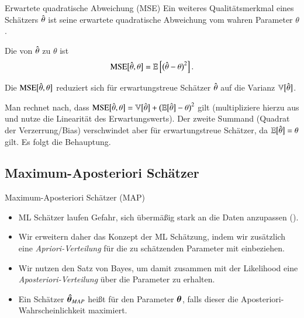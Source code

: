 \begin{frame}{Erwartete quadratische Abweichung (MSE)}{}
	Ein weiteres Qualitätsmerkmal eines Schätzers $\hat{\theta}$ ist seine erwartete quadratische
	Abweichung vom wahren Parameter $\theta$.
	
	\begin{mydef}
		Die  von $\hat{\theta}$ zu $\theta$ ist
		\begin{equation*}
			\text{MSE}\bigl[ \hat{\theta}, \theta \bigr] = \mathbb{E}\left[ \bigl( \hat{\theta} - \theta \bigr)^2 \right].
		\end{equation*}
	\end{mydef}
	
	Die $\text{MSE}\bigl[ \hat{\theta}, \theta \bigr]$ reduziert sich für erwartungstreue Schätzer $\hat{\theta}$
	auf die Varianz $\mathbb{V}\bigl[ \hat{\theta} \bigr]$. \\
	\vspace*{2mm}
	\begin{myproof}
		Man rechnet nach, dass
		$\text{MSE}\bigl[ \hat{\theta}, \theta \bigr] = \mathbb{V}\bigl[ \hat{\theta} \bigr] + \bigl( \mathbb{E}\bigl[ \hat{\theta} \bigr] - \theta \bigr)^2$ gilt
		(multipliziere hierzu aus und nutze die Linearität des Erwartungswerts).
		Der zweite Summand (Quadrat der Verzerrung/Bias) verschwindet aber für erwartungstreue Schätzer,
		da $\mathbb{E}\bigl[ \hat{\theta} \bigr] = \theta$ gilt. Es folgt die Behauptung.
	\end{myproof}
\end{frame}


\subsection{Maximum-Aposteriori Schätzer}

\begin{frame}{Maximum-Aposteriori Schätzer (MAP)}{}
	\begin{itemize}
		\item ML Schätzer laufen Gefahr, sich übermäßig stark an die Daten anzupassen ().
		\item Wir erweitern daher das Konzept der ML Schätzung, indem wir zusätzlich eine \textit{Apriori-Verteilung}
			für die zu schätzenden Parameter mit einbeziehen.
		\item Wir nutzen den Satz von Bayes, um damit zusammen mit der Likelihood eine \textit{Aposteriori-Verteilung}
			über die Parameter zu erhalten.
		\item Ein Schätzer $\bm{\hat{\theta}}_{MAP}$ heißt  für den Parameter $\bm{\theta}$,
			falls dieser die Aposteriori-Wahrscheinlichkeit maximiert.
	\end{itemize}
\end{frame}


